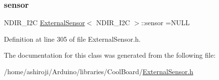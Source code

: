 \subsubsection{\texorpdfstring{sensor}{sensor}}
{\footnotesize\ttfamily N\+D\+I\+R\+\_\+\+I2C \hyperlink{classExternalSensor}{External\+Sensor}$<$ N\+D\+I\+R\+\_\+\+I2C $>$\+::sensor =N\+U\+LL\hspace{0.3cm}{\ttfamily [private]}}



Definition at line 305 of file External\+Sensor.\+h.



The documentation for this class was generated from the following file\+:\begin{DoxyCompactItemize}
\item 
/home/ashiroji/\+Arduino/libraries/\+Cool\+Board/\hyperlink{ExternalSensor_8h}{External\+Sensor.\+h}\end{DoxyCompactItemize}
